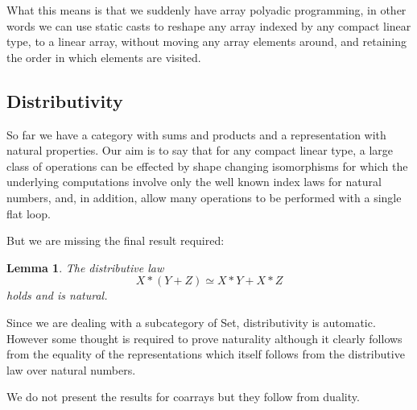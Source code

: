 \documentclass{article}
\newtheorem{lemma}{Lemma}
\begin{document}
What this means is that we suddenly have array polyadic programming,
in other words we can use static casts to reshape any array indexed
by any compact linear type, to a linear array, without moving any 
array elements around, and retaining the order in which
elements are visited.

\subsection{Distributivity}
So far we have a category with sums and products and a representation
with natural properties. Our aim is to say that for any compact linear
type, a large class of operations can be effected by shape changing
isomorphisms for which the underlying computations involve only
the well known index laws for natural numbers, and, in addition,
allow many operations to be performed with a single flat loop.

But we are missing the final result required:
\begin{lemma}
The distributive law
$$X*(Y+Z) \simeq X*Y + X*Z$$
holds and is natural.
\end{lemma}

Since we are dealing with a subcategory of Set, distributivity is automatic.
However some thought is required to prove naturality although it clearly
follows from the equality of the representations which itself follows
from the distributive law over natural numbers.

We do not present the results for coarrays but they follow from duality.
\end{document}
